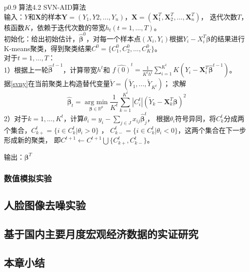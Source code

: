 \begin{table}[H]%
    \centering%
    \begin{tabular}{{p{0.9\columnwidth}}}%
    \toprule%
    算法4.2 SVN-AID算法\\
    \midrule%
    输入：$Y$和$\bm{X}$的样本$\bm{Y} = (Y_1, Y2, ..., Y_n)$，$\bm{X} = (\bm{X}^T_1, \bm{X}^T_2, ..., \bm{X}^T_n)$，
    迭代次数$T$，核函数$K$，依赖于迭代次数的带宽$h_t(t = 1, ..., T)。$
    \\
    初始化：给出初始估计，$\hat{\bm{\beta}}^{0} $，对每一个样本点$(X_i, Y_i)$根据$Y_i - X_i^T\bm{\beta} $的结果进行
    K-means聚类，得到聚类结果$C^0 = \{C_1^0, C_2^0, ... , C_K^0\}$。
    \\
    对于$t = 1, ..., T$：\\
        1）根据上一轮$\hat{\bm{\beta}}^{t-1}$，计算带宽$h^t$和
        $\hat{f(0)}^t = \frac{1}{K^th^t}\sum_{i=1}^{K^t}K(Y_i - \bm{X}_i^T\hat{\bm{\beta}}^{t-1})$。\\
        据\eqref{svny}在当前聚类上构造替代变量$\tilde{Y} = (\tilde{Y}_1, ..., \tilde{Y}_{K^t})$；
        求解
        $$
            \hat{\bm{\beta}}_t = \underset{\bm{\beta} \in \mathbb{R}^{p}}{\operatorname{arg\ min}}
            \frac1{K^t} \sum_{k=1}^{K^t}|C_i^{t}|(\tilde{Y}_k - \bm{X}_k^T\bm{\beta})^2
        $$
        2）对于$k = 1, ..., K^t$，计算$\theta_i = y_i - \sum_{j \in J}x_{ij}\hat{\bm{\beta}}_j^t$，
        根据$\theta_i$符号异同，将$C^t_k$分成两个集合，$C_{k+}^t = \{i \in C_k^t | \theta_i > 0\}$ ，
        $C_{k-}^t = \{i \in C_k^t | \theta_i < 0\}$，这两个集合在下一步形成新的聚类，
        即$C^{t+1} \leftarrow C^{t+1}\bigcup \{ C_{k+}^t, C_{k-}^t\}$。 
        
        输出：$\bm{\beta}^{T}$
    \\
    \bottomrule%
    \end{tabular}
\end{table}%

\subsubsection{数值模拟实验}

\subsection{人脸图像去噪实验}

\subsection{基于国内主要月度宏观经济数据的实证研究}

\subsection{本章小结}